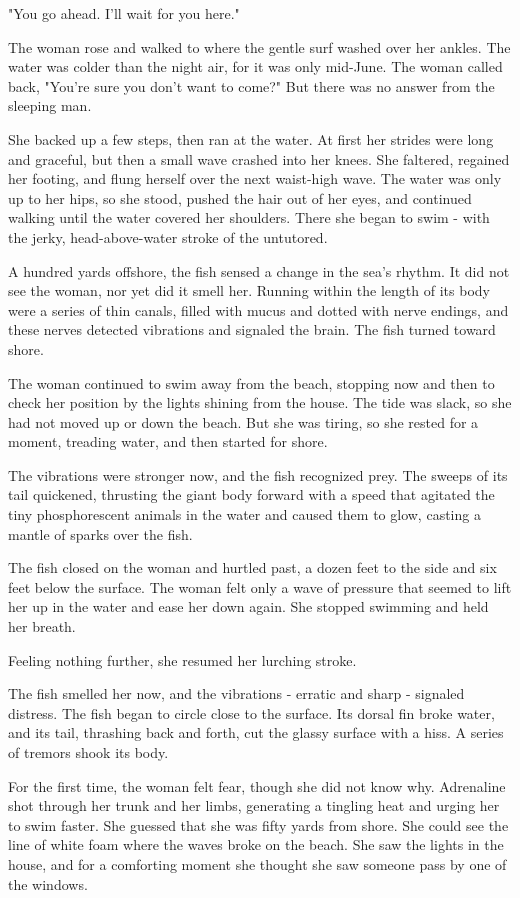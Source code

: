 \documentclass[10pt,a5paper,twoside]{book}
\begin{document}
"You go ahead. I'll wait for you here."

The woman rose and walked to where the gentle surf washed over her ankles. The water was colder than the night air, for it was only mid-June. The woman called back, "You're sure you don't want to come?" But there was no answer from the sleeping man.

She backed up a few steps, then ran at the water. At first her strides were long and graceful, but then a small wave crashed into her knees. She faltered, regained her footing, and flung herself over the next waist-high wave. The water was only up to her hips, so she stood, pushed the hair out of her eyes, and continued walking until the water covered her shoulders. There she began to swim - with the jerky, head-above-water stroke of the untutored.

A hundred yards offshore, the fish sensed a change in the sea's rhythm. It did not see the woman, nor yet did it smell her. Running within the length of its body were a series of thin canals, filled with mucus and dotted with nerve endings, and these nerves detected vibrations and signaled the brain. The fish turned toward shore.

The woman continued to swim away from the beach, stopping now and then to check her position by the lights shining from the house. The tide was slack, so she had not moved up or down the beach. But she was tiring, so she rested for a moment, treading water, and then started for shore.

The vibrations were stronger now, and the fish recognized prey. The sweeps of its tail quickened, thrusting the giant body forward with a speed that agitated the tiny phosphorescent animals in the water and caused them to glow, casting a mantle of sparks over the fish.

The fish closed on the woman and hurtled past, a dozen feet to the side and six feet below the surface. The woman felt only a wave of pressure that seemed to lift her up in the water and ease her down again. She stopped swimming and held her breath.

Feeling nothing further, she resumed her lurching stroke.

The fish smelled her now, and the vibrations - erratic and sharp - signaled distress. The fish began to circle close to the surface. Its dorsal fin broke water, and its tail, thrashing back and forth, cut the glassy surface with a hiss. A series of tremors shook its body.

For the first time, the woman felt fear, though she did not know why. Adrenaline shot through her trunk and her limbs, generating a tingling heat and urging her to swim faster. She guessed that she was fifty yards from shore. She could see the line of white foam where the waves broke on the beach. She saw the lights in the house, and for a comforting moment she thought she saw someone pass by one of the windows.
\end{document}
